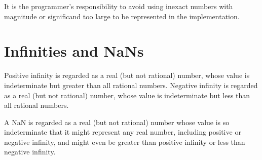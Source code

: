 It is the programmer's responsibility to avoid using inexact numbers
with magnitude or significand too large to be represented in the
implementation.

\section{Infinities and NaNs}

Positive infinity is regarded as a real (but not rational) number,
whose value is indeterminate but greater than all rational numbers.
Negative infinity is regarded as a real (but not rational) number,
whose value is indeterminate but less than all rational numbers.

A NaN is regarded as a real (but not rational) number whose value is
so indeterminate that it might represent any real number, including
positive or negative infinity, and might even be greater than positive
infinity or less than negative infinity.

